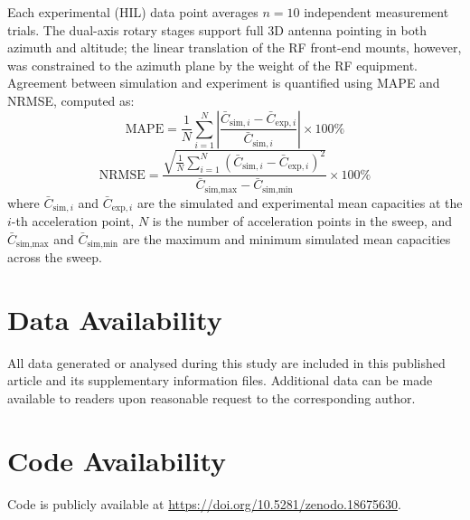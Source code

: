 \documentclass[fleqn,10pt]{wlscirep}
\newcommand{\rev}[1]{#1}
\begin{document}
Each experimental (HIL) data point averages $n = 10$ independent measurement trials. \rev{The dual-axis rotary stages support full 3D antenna pointing in both azimuth and altitude; the linear translation of the RF front-end mounts, however, was constrained to the azimuth plane by the weight of the RF equipment.} Agreement between simulation and experiment is quantified using MAPE and NRMSE, computed as:
\begin{equation}
    \text{MAPE} = \frac{1}{N} \sum_{i=1}^{N} \left| \frac{\bar{C}_{\text{sim},i} - \bar{C}_{\text{exp},i}}{\bar{C}_{\text{sim},i}} \right| \times 100\%
\end{equation}
\begin{equation}
    \text{NRMSE} = \frac{\sqrt{\frac{1}{N}\sum_{i=1}^{N}(\bar{C}_{\text{sim},i} - \bar{C}_{\text{exp},i})^2}}{\bar{C}_{\text{sim,max}} - \bar{C}_{\text{sim,min}}} \times 100\%
\end{equation}
where $\bar{C}_{\text{sim},i}$ and $\bar{C}_{\text{exp},i}$ are the simulated and experimental mean capacities at the $i$-th acceleration point, $N$ is the number of acceleration points in the sweep, and $\bar{C}_{\text{sim,max}}$ and $\bar{C}_{\text{sim,min}}$ are the maximum and minimum simulated mean capacities across the sweep.

\section*{Data Availability}
All data generated or analysed during this study are included in this published article and its supplementary information files. Additional data can be made available to readers upon reasonable request to the corresponding author.

\section*{Code Availability}
Code is publicly available at \url{https://doi.org/10.5281/zenodo.18675630}.

\end{document}
